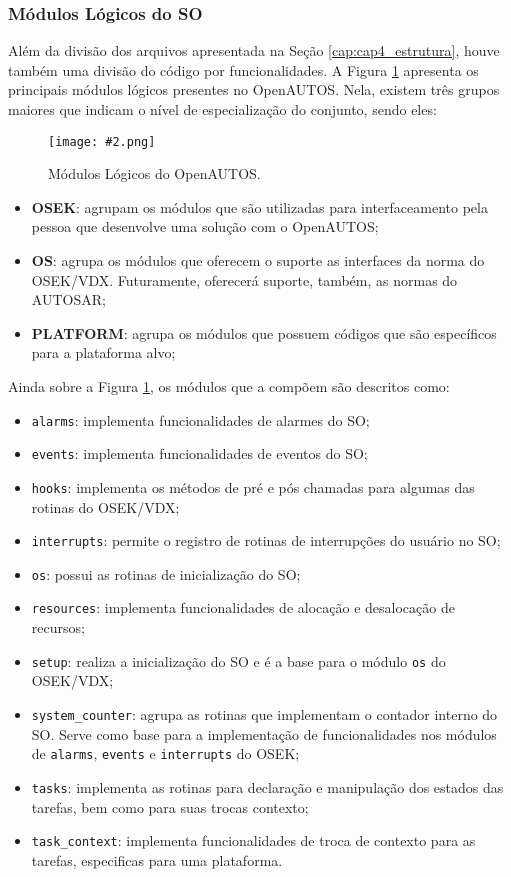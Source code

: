 \documentclass[conference,compsoc]{IEEEtran}
\newcommand{\reffig}[1]{Figura \ref{fig:#1}}
\newcommand{\reftop}[1]{Seção \ref{cap:#1}}
\newcommand{\figura}[5][Extraido de:]{
	\begin{figure}[h!tb]
		\centering
		\caption{#3.}
		\texttt{[image: \#2.png]}
		\ifthenelse{\isempty{#5}}{}{%
			\\ #1 \cite{#5}.
		}	
		\label{fig:#2}
	\end{figure}
}
\begin{document}
\subsubsection{Módulos Lógicos do SO}

Além da divisão dos arquivos apresentada na \reftop{cap4_estrutura}, houve também uma divisão do código por funcionalidades. A \reffig{cap4_modules} apresenta os principais módulos lógicos presentes no OpenAUTOS. Nela, existem três grupos maiores que indicam o nível de especialização do conjunto, sendo eles:

\figura{cap4_modules}{Módulos Lógicos do OpenAUTOS}{7cm}{}

\begin{itemize}
	\item \textbf{OSEK}: agrupam os módulos que são utilizadas para interfaceamento pela pessoa que desenvolve uma solução com o OpenAUTOS;
	\item \textbf{OS}: agrupa os módulos que oferecem o suporte as interfaces da norma do OSEK/VDX. Futuramente, oferecerá suporte, também, as normas do AUTOSAR;
	\item \textbf{PLATFORM}: agrupa os módulos que possuem códigos que são específicos para a plataforma alvo;
\end{itemize}

Ainda sobre a \reffig{cap4_modules}, os módulos que a compõem são descritos como:

\begin{itemize}
	\item \texttt{alarms}: implementa funcionalidades de alarmes do SO;
	\item \texttt{events}: implementa funcionalidades de eventos do SO;
	\item \texttt{hooks}: implementa os métodos de pré e pós chamadas para algumas das rotinas do OSEK/VDX;
	\item \texttt{interrupts}: permite o registro de rotinas de interrupções do usuário no SO;
	\item \texttt{os}: possui as rotinas de inicialização do SO;
	\item \texttt{resources}: implementa funcionalidades de alocação e desalocação de recursos;
	\item \texttt{setup}: realiza a inicialização do SO e é a base para o módulo \texttt{os} do OSEK/VDX;
	\item \texttt{system\_counter}: agrupa as rotinas que implementam o contador interno do SO. Serve como base para a implementação de funcionalidades nos módulos de \texttt{alarms}, \texttt{events} e \texttt{interrupts} do OSEK;
	\item \texttt{tasks}: implementa as rotinas para declaração e manipulação dos estados das tarefas, bem como para suas trocas contexto;
	\item \texttt{task\_context}: implementa funcionalidades de troca de contexto para as tarefas, especificas para uma plataforma.
\end{itemize}
\end{document}
